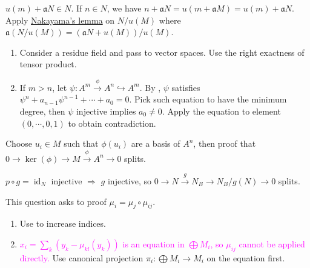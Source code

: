 \begin{exercise}\label{ex2.10}
	$u(m)+\mathfrak{a}N\in N$. If $n\in N$, we have $n+\mathfrak{a}N=u(m+\mathfrak{a}M)=u(m)+\mathfrak{a}N$. Apply \hyperref[2.6]{Nakayama's lemma} on $N/u(M)$ where $\mathfrak{a}(N/u(M))=\left(\mathfrak{a}N+u(M)\right)/u(M)$.
\end{exercise}

\begin{exercise}\label{ex2.11}
	\begin{enumerate}
		\item[(i),(ii)] Consider a residue field and pass to vector spaces. Use the right exactness of tensor product.
		\item[(iii)] If $m>n$, let $\psi:A^m\xrightarrow{\phi}A^n\hookrightarrow A^m$. By , $\psi$ satisfies $\psi^n+a_{n-1}\psi^{n-1}+\cdots+a_0=0$. Pick such equation to have the minimum degree, then $\psi$ injective implies $a_0\neq0$. Apply the equation to element $(0,\cdots,0,1)$ to obtain contradiction.
	\end{enumerate}
\end{exercise}

\begin{exercise}\label{ex2.12}
	Choose $u_i\in M$ such that $\phi\left(u_i\right)$ are a basis of $A^n$, then proof that $0\rightarrow\ker(\phi)\rightarrow M\xrightarrow{\phi}A^n\rightarrow0$ splits.
\end{exercise}

\begin{exercise}\label{ex2.13}
	$p\circ g=\operatorname{id}_N$ injective $\Rightarrow$ $g$ injective, so $0\rightarrow N\xrightarrow{g}N_B\rightarrow N_B/g(N)\rightarrow0$ splits.
\end{exercise}

\begin{exercise}\label{ex2.14}
	This question asks to proof $\mu_i=\mu_j\circ\mu_{ij}$.
\end{exercise}

\begin{exercise}\label{ex2.15}
	\begin{enumerate}[label=(\roman*),ref=\theexercise(\roman*)]
		\item\label{ex2.15.1} Use  to increase indices.
		\item\label{ex2.15.2} \textcolor{magenta}{$x_i=\sum_k\left(y_k-\mu_{kl}\left(y_k\right)\right)$ is an equation in $\bigoplus M_i$, so $\mu_{ij}$ cannot be applied directly.} Use canonical projection $\pi_i:\bigoplus M_i\rightarrow M_i$ on the equation first.
	\end{enumerate}
\end{exercise}

